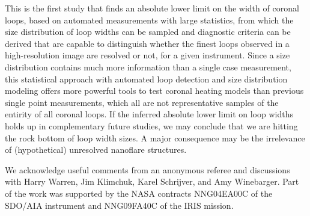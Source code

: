 \documentclass[10pt,preprint]{aastex}  %
\begin{document}
This is the first study that finds an absolute lower limit on the
width of coronal loops, based on automated measurements with large
statistics, from which the size distribution of loop widths can be 
sampled and diagnostic criteria can be derived that are capable to
distinguish whether the finest loops observed in a high-resolution
image are resolved or not, for a given instrument. Since a size
distribution contains much more information than a single case
measurement, this statistical approach with automated loop detection 
and size distribution modeling offers more powerful tools to test
coronal heating models than previous single point measurements,
which all are not representative samples of the entirity of all coronal 
loops. If the inferred absolute lower limit on loop widths holds up
in complementary future studies, we may conclude that we are hitting
the rock bottom of loop width sizes. A major consequence may be
the irrelevance of (hypothetical) unresolved nanoflare structures.

\bigskip
\acknowledgements
We acknowledge useful comments from an anonymous referee and 
discussions with Harry Warren, Jim Klimchuk, Karel Schrijver,
and Amy Winebarger. Part of the work was supported by the
NASA contracts NNG04EA00C of the SDO/AIA instrument and
NNG09FA40C of the IRIS mission.
\end{document}
